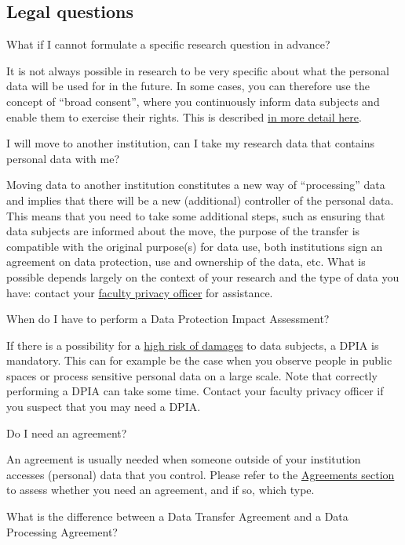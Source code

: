 \documentclass[
]{book}
\begin{document}
\hypertarget{legal}{%
\subsection{Legal questions}\label{legal}}

What if I cannot formulate a specific research question in advance?

It is not always possible in research to be very specific about what the personal data will be used for in the future. In some cases, you can therefore use the concept of ``broad consent'', where you continuously inform data subjects and enable them to exercise their rights. This is described \protect\hyperlink{broad-consent}{in more detail here}.

I will move to another institution, can I take my research data that contains personal data with me?

Moving data to another institution constitutes a new way of ``processing'' data and implies that there will be a new (additional) controller of the personal data. This means that you need to take some additional steps, such as ensuring that data subjects are informed about the move, the purpose of the transfer is compatible with the original purpose(s) for data use, both institutions sign an agreement on data protection, use and ownership of the data, etc. What is possible depends largely on the context of your research and the type of data you have: contact your \href{https://intranet.uu.nl/en/knowledgebase/privacyofficers}{faculty privacy officer} for assistance.

When do I have to perform a Data Protection Impact Assessment?

If there is a possibility for a \protect\hyperlink{high-risk-processing}{high risk of damages} to data subjects, a DPIA is mandatory. This can for example be the case when you observe people in public spaces or process sensitive personal data on a large scale. Note that correctly performing a DPIA can take some time. Contact your faculty privacy officer if you suspect that you may need a DPIA.

Do I need an agreement?

An agreement is usually needed when someone outside of your institution accesses (personal) data that you control. Please refer to the \protect\hyperlink{agreements}{Agreements section} to assess whether you need an agreement, and if so, which type.

What is the difference between a Data Transfer Agreement and a Data Processing Agreement?
\end{document}

